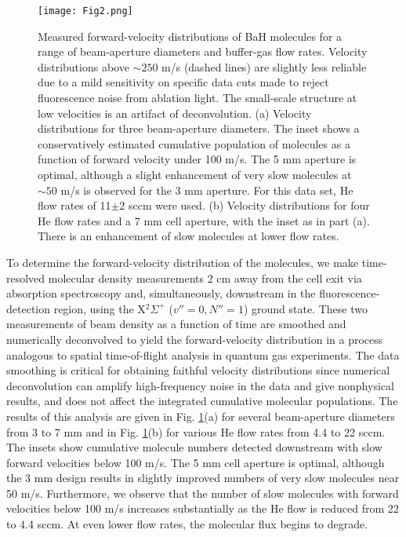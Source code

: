 \documentclass[amsmath,amssymb,aps,twocolumn,longbibliography,notitlepage]{revtex4-1}
\begin{document}
\begin{figure}[h]
\texttt{[image: Fig2.png]}
\caption{Measured forward-velocity distributions of BaH molecules for a range of beam-aperture diameters and buffer-gas flow rates.  Velocity distributions above $\sim250$ m/s (dashed lines) are slightly less reliable due to a mild sensitivity on specific data cuts made to reject fluorescence noise from ablation light.  The small-scale structure at low velocities is an artifact of deconvolution. (a) Velocity distributions for three beam-aperture diameters.  The inset shows a conservatively estimated cumulative population of molecules as a function of forward velocity under 100 m/s.  The 5 mm aperture is optimal, although a slight enhancement of very slow molecules at $\sim50$ m/s is observed for the 3 mm aperture.  For this data set, He flow rates of 11$\pm$2 sccm were used.  (b) Velocity distributions for four He flow rates and a 7 mm cell aperture, with the inset as in part (a).  There is an enhancement of slow molecules at lower flow rates.}
\label{fig:vel_dist}
\centering
\end{figure}
To determine the forward-velocity distribution of the molecules, we make time-resolved molecular density measurements 2 cm away from the cell exit via absorption spectroscopy and, simultaneously, downstream in the fluorescence-detection region, using the X$^2\Sigma^+$ ($v''=0,N''=1$) ground state.  These two measurements of beam density as a function of time are smoothed and numerically deconvolved to yield the forward-velocity distribution in a process analogous to spatial time-of-flight analysis in quantum gas experiments.  The data smoothing is critical for obtaining faithful velocity distributions since numerical deconvolution can amplify high-frequency noise in the data and give nonphysical results, and does not affect the integrated cumulative molecular populations.  The results of this analysis are given in Fig. \ref{fig:vel_dist}(a) for several beam-aperture diameters from 3 to 7 mm and in Fig. \ref{fig:vel_dist}(b) for various He flow rates from 4.4 to 22 sccm.  The insets show cumulative molecule numbers detected downstream with slow forward velocities below 100 m/s.  The 5 mm cell aperture is optimal, although the 3 mm design results in slightly improved numbers of very slow molecules near 50 m/s.  Furthermore, we observe that the number of slow molecules with forward velocities below 100 m/s increases substantially as the He flow is reduced from 22 to 4.4 sccm.  At even lower flow rates, the molecular flux begins to degrade.
\end{document}
